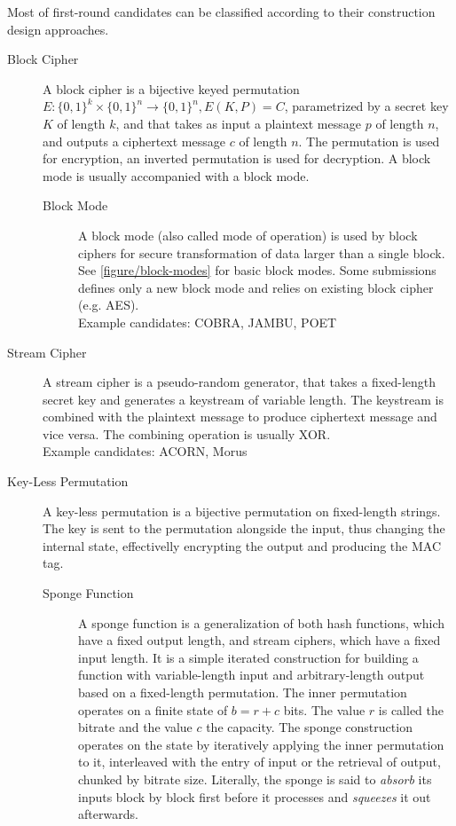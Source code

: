 


Most of first-round candidates can be classified according to their construction design approaches. \cite{cryptoeprint:2014:792}

\begin{description}
  \item[Block Cipher] A block cipher is a bijective keyed permutation $E: \{0, 1\}^k \times \{0, 1\}^n \rightarrow \{0, 1\}^n, E(K, P) = C$, parametrized by a secret key $K$ of length $k$, and that takes as input a plaintext message $p$ of length $n$, and outputs a ciphertext message $c$ of length $n$. The permutation is used for encryption, an inverted permutation is used for decryption. A block mode is usually accompanied with a block mode.
  \begin{description}
    \item[Block Mode] A block mode (also called mode of operation) is used by block ciphers for secure transformation of data larger than a single block. See \autoref{figure/block-modes} for basic block modes. Some submissions defines only a new block mode and relies on existing block cipher (e.g. AES). \cite{cryptoeprint:2014:186} \\
    Example candidates: COBRA, JAMBU, POET
  \end{description}
  \item[Stream Cipher] A stream cipher is a pseudo-random generator, that takes a fixed-length secret key and generates a keystream of variable length. The keystream is combined with the plaintext message to produce ciphertext message and vice versa. The combining operation is usually XOR. \\
  Example candidates: ACORN, Morus
  \item[Key-Less Permutation] A key-less permutation is a bijective permutation on fixed-length strings. The key is sent to the permutation alongside the input, thus changing the internal state, effectivelly encrypting the output and producing the MAC tag.
  \begin{description}
    \item[Sponge Function] A sponge function is a generalization of both hash functions, which have a fixed output length, and stream ciphers, which have a fixed input length. It is a simple iterated construction for building a function with variable-length input and arbitrary-length output based on a fixed-length permutation. The inner permutation operates on a finite state of $b = r + c$ bits. The value $r$ is called the bitrate and the value $c$ the capacity. The sponge construction operates on the state by iteratively applying the inner permutation to it, interleaved with the entry of input or the retrieval of output, chunked by bitrate size. Literally, the sponge is said to \textit{absorb} its inputs block by block first before it processes and \textit{squeezes} it out afterwards. \cite{sponge-functions} \\

\end{description}
\end{description}
